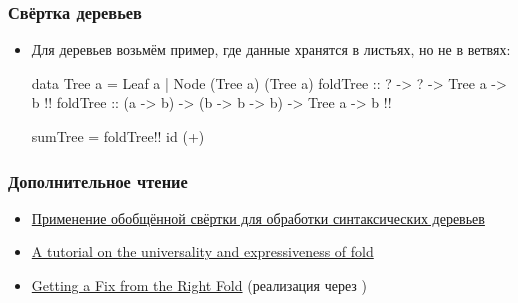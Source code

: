 \documentclass[11pt]{beamer}
\begin{document}
\begin{frame}[fragile]
  \frametitle{Свёртка деревьев}
  \begin{itemize}
    \item Для деревьев возьмём пример, где данные хранятся в листьях, но не в ветвях:
          \begin{haskellsmall}
            data Tree a = Leaf a | Node (Tree a) (Tree a)
            foldTree   :: ? ->        ?             -> Tree a -> b !\pause!
            foldTree   :: (a -> b) -> (b -> b -> b) -> Tree a -> b !\pause!

            sumTree = foldTree!\pause! id (+)
          \end{haskellsmall}
  \end{itemize}
\end{frame}

\begin{frame}[fragile]
  \frametitle{Дополнительное чтение}
  \begin{itemize}
    \item \href{https://habr.com/ru/post/667058/}{Применение обобщённой свёртки для обработки синтаксических деревьев}
    \item \href{http://www.cs.nott.ac.uk/~pszgmh/fold.pdf}{A tutorial on the universality and expressiveness of fold}
    \item \href{https://wiki.haskell.org/wikiupload/1/14/TMR-Issue6.pdf}{Getting a Fix from the Right Fold} (реализация  через )
  \end{itemize} 
\end{frame}
\end{document}
